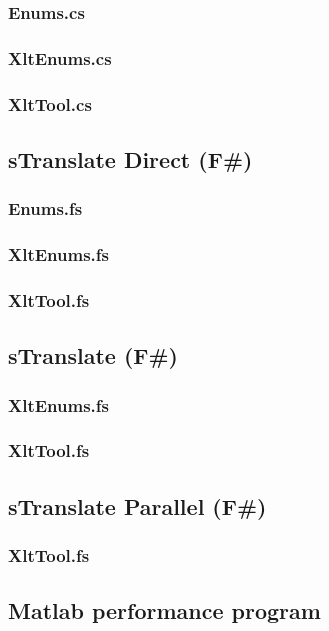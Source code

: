\documentclass[12pt, a4paper]{article}
\begin{document}
\subsubsection{Enums.cs}

\newpage
\subsubsection{XltEnums.cs}

\newpage
\subsubsection{XltTool.cs}


\newpage
\subsection{sTranslate Direct (F\#)}
\label{AppendixFSharpDirect}
\subsubsection{Enums.fs}

\newpage
\subsubsection{XltEnums.fs}

\newpage
\subsubsection{XltTool.fs}


\newpage
\subsection{sTranslate (F\#)}
\label{AppendixFSharp}
\subsubsection{XltEnums.fs}

\newpage
\subsubsection{XltTool.fs}


\newpage
\subsection{sTranslate Parallel (F\#)}
\label{AppendixFSharpParallel}
\subsubsection{XltTool.fs}


\newpage
\subsection{Matlab performance program}

\end{document}
